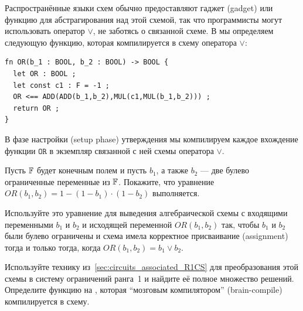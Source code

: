 Распространённые языки схем обычно предоставляют гаджет (gadget) или функцию для абстрагирования над этой схемой, так что программисты могут использовать оператор $\vee$, не заботясь о связанной схеме. В  мы определяем следующую функцию, которая компилируется в схему оператора $\vee$:
\begin{lstlisting}
fn OR(b_1 : BOOL, b_2 : BOOL) -> BOOL {
  let OR : BOOL ;
  let const c1 : F = -1 ;
  OR <== ADD(ADD(b_1,b_2),MUL(c1,MUL(b_1,b_2))) ;
  return OR ;
}
\end{lstlisting}
В фазе настройки (setup phase) утверждения мы компилируем каждое вхождение функции $\mathtt{OR}$ в экземпляр связанной с ней схемы оператора $\vee$.
\begin{exercise} Пусть $\mathbb{F}$ будет конечным полем и пусть $b_1$, а также $b_2$ --- две булево ограниченные переменные из $\mathbb{F}$. Покажите, что уравнение
$OR(b_1,b_2) = 1 - (1 - b_1)\cdot (1 - b_2)$ выполняется.

Используйте это уравнение для выведения алгебраической схемы с входящими переменными $b_1$ и $b_2$ и исходящей переменной $OR(b_1,b_2)$ так, чтобы $b_1$ и $b_2$ были булево ограничены и схема имела корректное присваивание (assignment) тогда и только тогда, когда $OR(b_1,b_2) = b_1 \vee b_2$.

Используйте технику из~\ref{sec:circuits_associated_R1CS} для преобразования этой схемы в систему ограничений ранга~1 и найдите её полное множество решений. Определите функцию на , которая ``мозговым компилятором'' (brain-compile) компилируется в схему.

\end{exercise}
